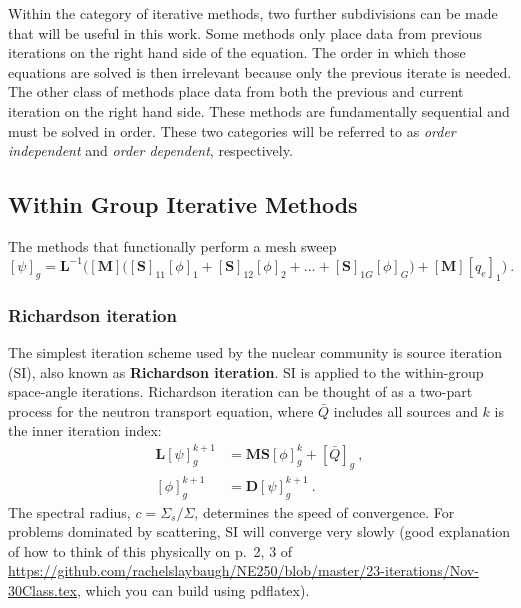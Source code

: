 \documentclass[12pt]{article}
\newcommand{\ve}[1]{\ensuremath{\mathbf{#1}}}
\newcommand{\Macro}{\ensuremath{\Sigma}}
\begin{document}
Within the category of iterative methods, two further subdivisions can be made that will be useful in this work. Some methods only place data from previous iterations on the right hand side of the equation. The order in which those equations are solved is then irrelevant because only the previous iterate is needed. The other class of methods place data from both the previous and current iteration on the right hand side. These methods are fundamentally sequential and must be solved in order. These two categories will be referred to as \textit{order independent} and \textit{order dependent}, respectively. 

\subsection*{Within Group Iterative Methods}
The methods that functionally perform a mesh sweep
\[
[\psi]_g = \ve{L}^{-1}\bigl([\ve{M}]\bigl([\ve{S}]_{11}[\phi]_1 + 
    [\ve{S}]_{12}[\phi]_2 + \ldots + [\ve{S}]_{1G}[\phi]_G\bigr) + 
    [\ve{M}][q_{e}]_1\bigr)\:.
\]
\subsubsection*{Richardson iteration}
The simplest iteration scheme used by the nuclear community is source iteration (SI), also known as \textbf{Richardson iteration}. SI is applied to the within-group space-angle iterations. Richardson iteration can be thought of as a two-part process for the neutron transport equation, where $\bar{Q}$ includes all sources and $k$ is the inner iteration index:
%
\begin{align}
  \ve{L}[\psi]_g^{k+1} &= \ve{MS} [\phi]_g^k + [\bar{Q}]_{g} \:,   \label{eq:SIpsi} \\
  [\phi]_g^{k+1} &= \ve{D}[\psi]_g^{k+1} \:.
  \label{eq:SIphi}
\end{align}
%
The spectral radius, $c = \Macro_s / \Macro$, determines the speed of convergence. For problems dominated by scattering, SI will converge very slowly (good explanation of how to think of this physically on p.\ 2, 3 of  \href{https://github.com/rachelslaybaugh/NE250/blob/master/23-iterations/Nov-30Class.tex}{https://github.com/rachelslaybaugh/NE250/blob/master/23-iterations/Nov-30Class.tex}, which you can build using pdflatex). 

\end{document}
